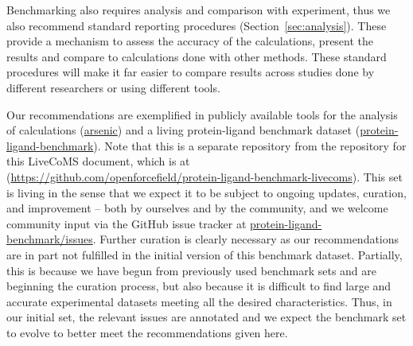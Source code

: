 \documentclass[9pt,bestpractices,pubversion]{livecoms}
\newcommand{\githubrepository}{\href{https://github.com/openforcefield/protein-ligand-benchmark-livecoms}{https://github.com/openforcefield/\hspace{0em}protein-ligand-benchmark-livecoms}}  %
\begin{document}
Benchmarking also requires analysis and comparison with experiment, thus we also recommend standard reporting procedures (Section~\ref{sec:analysis}). These provide a mechanism to assess the accuracy of the calculations, present the results and compare to calculations done with other methods. These standard procedures will make it far easier to compare results across studies done by different researchers or using different tools.

Our recommendations are exemplified in publicly available tools for the analysis of calculations (\href{http://github.com/OpenFreeEnergy/arsenic}{arsenic})
and a living protein-ligand benchmark dataset (\href{http://github.com/openforcefield/protein-ligand-benchmark}{protein-ligand-benchmark}). Note that this is a separate repository from the repository for this LiveCoMS document, which is at (\githubrepository). 
%
This set is living in the sense that we expect it to be subject to ongoing updates, curation, and improvement -- both by ourselves and by the community, and we welcome community input via the GitHub issue tracker at \href{http://github.com/openforcefield/protein-ligand-benchmark/issues}{protein-ligand-benchmark/issues}. Further curation is clearly necessary as our recommendations are in part not fulfilled in the initial version of this benchmark dataset. Partially, this is because we have begun from previously used benchmark sets and are beginning the curation process, but also because it is difficult to find large and accurate experimental datasets meeting all the desired characteristics. Thus, in our initial set, the relevant issues are annotated and we expect the benchmark set to evolve to better meet the recommendations given here.
\end{document}
